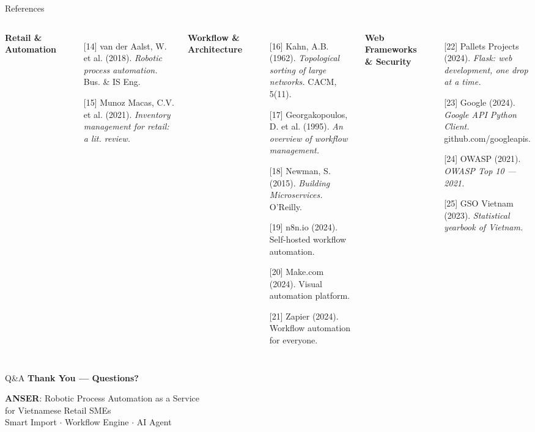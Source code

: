 \documentclass[10pt,aspectratio=169]{beamer}
\begin{document}
\begin{frame}{References}
\begin{columns}[T]
        \textbf{Retail \& Automation}
        \begin{enumerate}
            \item[{[14]}] van der Aalst, W. et al. (2018). \textit{Robotic process automation.} Bus. \& IS Eng.
            \item[{[15]}] Munoz Macas, C.V. et al. (2021). \textit{Inventory management for retail: a lit. review.}
        \end{enumerate}
        \vspace{0.05cm}
        \textbf{Workflow \& Architecture}
        \begin{enumerate}
            \item[{[16]}] Kahn, A.B. (1962). \textit{Topological sorting of large networks.} CACM, 5(11).
            \item[{[17]}] Georgakopoulos, D. et al. (1995). \textit{An overview of workflow management.}
            \item[{[18]}] Newman, S. (2015). \textit{Building Microservices.} O'Reilly.
            \item[{[19]}] n8n.io (2024). Self-hosted workflow automation.
            \item[{[20]}] Make.com (2024). Visual automation platform.
            \item[{[21]}] Zapier (2024). Workflow automation for everyone.
        \end{enumerate}
        \vspace{0.05cm}
        \textbf{Web Frameworks \& Security}
        \begin{enumerate}
            \item[{[22]}] Pallets Projects (2024). \textit{Flask: web development, one drop at a time.}
            \item[{[23]}] Google (2024). \textit{Google API Python Client.} github.com/googleapis.
            \item[{[24]}] OWASP (2021). \textit{OWASP Top 10 --- 2021.}
            \item[{[25]}] GSO Vietnam (2023). \textit{Statistical yearbook of Vietnam.}
        \end{enumerate}
        \vspace{0.05cm}
    \end{columns}
\end{frame}

\begin{frame}{Q\&A}
    \centering
    \vspace{1cm}
    \Large \textbf{Thank You --- Questions?}
    \vspace{0.5cm}

    \normalsize
    \textbf{ANSER}: Robotic Process Automation as a Service\\
    for Vietnamese Retail SMEs\\[0.5cm]
    \small
    Smart Import $\cdot$ Workflow Engine $\cdot$ AI Agent
\end{frame}
\end{document}
